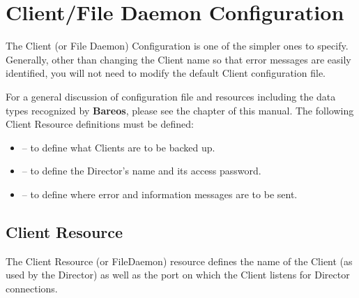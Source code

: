 
\chapter{Client/File Daemon Configuration}
\label{FiledConfChapter}

The Client (or File Daemon) Configuration is one of the simpler ones to
specify. Generally, other than changing the Client name so that error messages
are easily identified, you will not need to modify the default Client
configuration file.

For a general discussion of configuration file and resources including the
data types recognized by {\bf Bareos}, please see the
 chapter of this manual. The
following Client Resource definitions must be defined:

\begin{itemize}
\item
    -- to define what Clients are  to
   be backed up.
\item
    -- to  define the Director's
   name and its access password.
\item
    -- to define where error  and
   information messages are to be sent.
\end{itemize}

\section{Client Resource}
\label{ClientResource}

The Client Resource (or FileDaemon) resource defines the name of the Client
(as used by the Director) as well as the port on which the Client listens for
Director connections.


